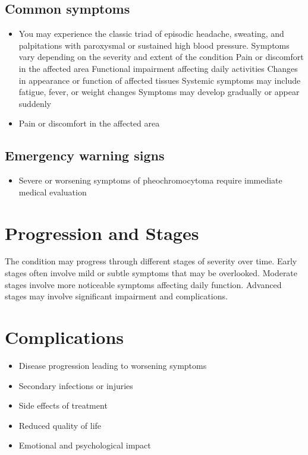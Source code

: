 \subsection{Common symptoms}
\begin{itemize}[noitemsep]
  \item You may experience the classic triad of episodic headache, sweating, and palpitations with paroxysmal or sustained high blood pressure. Symptoms vary depending on the severity and extent of the condition Pain or discomfort in the affected area Functional impairment affecting daily activities Changes in appearance or function of affected tissues Systemic symptoms may include fatigue, fever, or weight changes Symptoms may develop gradually or appear suddenly
  \item Pain or discomfort in the affected area
  \end{itemize}

\subsection{Emergency warning signs}
\begin{itemize}[noitemsep]
  \item Severe or worsening symptoms of pheochromocytoma require immediate medical evaluation
\end{itemize}
\section{Progression and Stages}
The condition may progress through different stages of severity over time. Early stages often involve mild or subtle symptoms that may be overlooked. Moderate stages involve more noticeable symptoms affecting daily function. Advanced stages may involve significant impairment and complications.
\section{Complications}
\begin{itemize}[noitemsep]
  \item Disease progression leading to worsening symptoms
  \item Secondary infections or injuries
  \item Side effects of treatment
  \item Reduced quality of life
  \item Emotional and psychological impact
\end{itemize}

